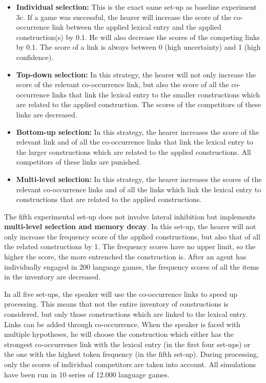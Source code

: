 \begin{itemize}
\item {\bfseries Individual selection:} This is the exact same set-up as baseline experiment 3c. If a game was successful, the hearer will increase the score of the co-occurrence link between the applied lexical entry and the applied construction(s) by 0.1. He will also decrease the scores of the competing links by 0.1. The score of a link is always between 0 (high uncertainty) and 1 (high confidence).
\item {\bfseries Top-down selection:} In this strategy, the hearer will not only increase the score of the relevant co-occurrence link, but also the score of all the co-occurrence links that link the lexical entry to the smaller constructions which are related to the applied construction. The scores of the competitors of these links are decreased.
\item {\bfseries Bottom-up selection:}  In this strategy, the hearer increases the score of the relevant link and of all the co-occurrence links that link the lexical entry to the larger constructions which are related to the applied constructions. All competitors of these links are punished.
\item {\bfseries Multi-level selection:} In this strategy, the hearer increases the scores of the relevant co-occurrence links and of all the links which link the lexical entry to constructions that are related to the applied constructions.
\end{itemize}

The fifth experimental set-up does not involve lateral inhibition but implements {\bfseries multi-level selection and memory decay}. In this set-up, the hearer will not only increase the frequency score of the applied constructions, but also that of all the related constructions by 1. The frequency scores have no upper limit, so the higher the score, the more entrenched the construction is. After an agent has individually engaged in 200 language games, the frequency scores of all the items in the inventory are decreased.

In all five set-ups, the speaker will use the co-occurrence links to speed up processing. This means that not the entire inventory of constructions is considered, but only those constructions which are linked to the lexical entry. Links can be added through co-occurrence. When the speaker is faced with multiple hypotheses, he will choose the construction which either has the strongest co-occurrence link with the lexical entry (in the first four set-ups) or the one with the highest token frequency (in the fifth set-up). During processing, only the scores of individual competitors are taken into account. All simulations have been run in 10 series of 12.000 language games.

